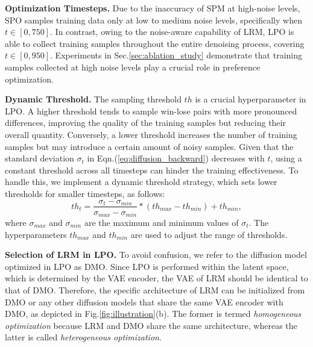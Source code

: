 \textbf{Optimization Timesteps.} Due to the inaccuracy of SPM at high-noise levels, SPO samples training data only at low to medium noise levels, specifically when $t\in[0, 750]$. In contrast, owing to the noise-aware capability of LRM, LPO is able to collect training samples throughout the entire denoising process, covering $t\in[0,950]$. Experiments in Sec.\;\ref{sec:ablation_study} demonstrate that training samples collected at high noise levels play a crucial role in preference optimization.

\textbf{Dynamic Threshold.} The sampling threshold $th$ is a crucial hyperparameter in LPO. A higher threshold tends to sample win-lose pairs with more pronounced differences, improving the quality of the training samples but reducing their overall quantity. Conversely, a lower threshold increases the number of training samples but may introduce a certain amount of noisy samples. Given that the standard deviation $\sigma_t$ in Eqn.\;(\ref{eq:diffusion_backward}) decreases with $t$, using a constant threshold across all timesteps can hinder the training effectiveness. To handle this, we implement a dynamic threshold strategy, which sets lower thresholds for smaller timesteps, as follows:
\begin{equation}
    th_t = \frac{\sigma_t-\sigma_{min}}{\sigma_{max}-\sigma_{min}}*(th_{max}-th_{min})+th_{min},
    \label{eq:dyn_thresh}
\end{equation}
where $\sigma_{max}$ and $\sigma_{min}$ are the maximum and minimum values of $\sigma_t$. The hyperparameters $th_{max}$ and $th_{min}$ are used to adjust the range of thresholds. 

\textbf{Selection of LRM in LPO.} To avoid confusion, we refer to the diffusion model optimized in LPO as DMO. Since LPO is performed within the latent space, which is determined by the VAE encoder, the VAE of LRM should be identical to that of DMO. Therefore, the specific architecture of LRM can be initialized from DMO or any other diffusion models that share the same VAE encoder with DMO, as depicted in Fig.\;\ref{fig:illustration}\;(b). The former is termed \textit{homogeneous optimization} because LRM and DMO share the same architecture, whereas the latter is called \textit{heterogeneous optimization}.
